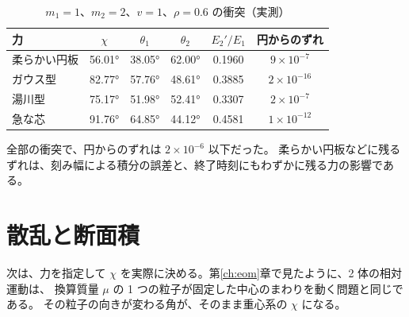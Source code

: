 

\begin{table}[htbp]
\centering
\caption{$m_1=1$、$m_2=2$、$v=1$、$\rho=0.6$ の衝突（実測）}\label{tab:coll-forces}
\begin{tabular}{lccccc}
\toprule
力 & $\chi$ & $\theta_1$ & $\theta_2$ & $E_2'/E_1$ & 円からのずれ \\
\midrule
柔らかい円板 & \ang{56.01} & \ang{38.05} & \ang{62.00} & 0.1960 & $9\times10^{-7}$ \\
ガウス型     & \ang{82.77} & \ang{57.76} & \ang{48.61} & 0.3885 & $2\times10^{-16}$ \\
湯川型       & \ang{75.17} & \ang{51.98} & \ang{52.41} & 0.3307 & $2\times10^{-7}$ \\
急な芯       & \ang{91.76} & \ang{64.85} & \ang{44.12} & 0.4581 & $1\times10^{-12}$ \\
\bottomrule
\end{tabular}
\end{table}


全部の衝突で、円からのずれは $2\times10^{-6}$ 以下だった。
柔らかい円板などに残るずれは、刻み幅による積分の誤差と、終了時刻にもわずかに残る力の影響である。

\section{散乱と断面積}\label{sec:coll-scattering}

次は、力を指定して $\chi$ を実際に決める。第\ref{ch:eom}章で見たように、2 体の相対運動は、
換算質量 $\mu$ の 1 つの粒子が固定した中心のまわりを動く問題と同じである。
その粒子の向きが変わる角が、そのまま重心系の $\chi$ になる。

